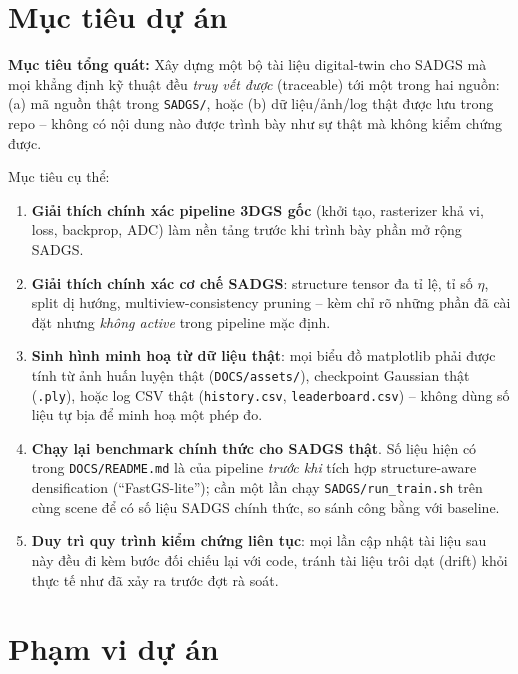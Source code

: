 \documentclass[a4paper,11pt]{article}
\begin{document}
\section{Mục tiêu dự án}

\begin{muctieu}
\textbf{Mục tiêu tổng quát:} Xây dựng một bộ tài liệu digital-twin cho SADGS mà mọi khẳng
định kỹ thuật đều \emph{truy vết được} (traceable) tới một trong hai nguồn: (a) mã nguồn thật
trong \texttt{SADGS/}, hoặc (b) dữ liệu/ảnh/log thật được lưu trong repo -- không có nội dung
nào được trình bày như sự thật mà không kiểm chứng được.
\end{muctieu}

\noindent Mục tiêu cụ thể:
\begin{enumerate}[leftmargin=1.4em]
    \item \textbf{Giải thích chính xác pipeline 3DGS gốc} (khởi tạo, rasterizer khả vi, loss,
    backprop, ADC) làm nền tảng trước khi trình bày phần mở rộng SADGS.
    \item \textbf{Giải thích chính xác cơ chế SADGS}: structure tensor đa tỉ lệ, tỉ số $\eta$,
    split dị hướng, multiview-consistency pruning -- kèm chỉ rõ những phần đã cài đặt nhưng
    \emph{không active} trong pipeline mặc định.
    \item \textbf{Sinh hình minh hoạ từ dữ liệu thật}: mọi biểu đồ matplotlib phải được tính
    từ ảnh huấn luyện thật (\texttt{DOCS/assets/}), checkpoint Gaussian thật (\texttt{.ply}),
    hoặc log CSV thật (\texttt{history.csv}, \texttt{leaderboard.csv}) -- không dùng số liệu
    tự bịa để minh hoạ một phép đo.
    \item \textbf{Chạy lại benchmark chính thức cho SADGS thật}. Số liệu hiện có trong
    \texttt{DOCS/README.md} là của pipeline \emph{trước khi} tích hợp structure-aware
    densification (``FastGS-lite''); cần một lần chạy \texttt{SADGS/run\_train.sh} trên cùng
    scene để có số liệu SADGS chính thức, so sánh công bằng với baseline.
    \item \textbf{Duy trì quy trình kiểm chứng liên tục}: mọi lần cập nhật tài liệu sau này
    đều đi kèm bước đối chiếu lại với code, tránh tài liệu trôi dạt (drift) khỏi thực tế như
    đã xảy ra trước đợt rà soát.
\end{enumerate}

\section{Phạm vi dự án}
\end{document}
